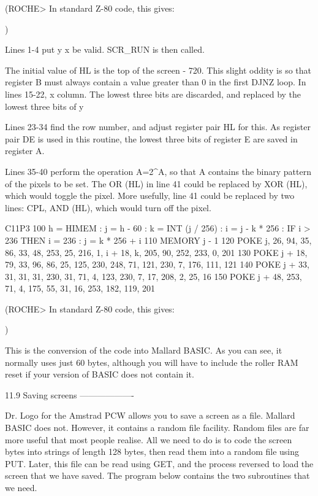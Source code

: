 (ROCHE> In standard Z-80 code, this gives:

$$$$
)

Lines  1-4 put y%
x%
be valid. SCR_RUN is then called.

The initial value of HL is the top of the screen - 720. This slight oddity  is 
so  that  register B must always contain a value greater than 0 in  the  first 
DJNZ loop. In lines 15-22, x%
column. The lowest three bits are discarded, and replaced by the lowest  three 
bits of y%

Lines  23-34  find the row number, and adjust register pair HL  for  this.  As 
register pair DE is used in this routine, the lowest three bits of register  E 
are saved in register A.

Lines 35-40 perform the operation A=2^A, so that A contains the binary pattern 
of the pixels to be set. The OR (HL) in line 41 could be replaced by XOR (HL), 
which would toggle the pixel. More usefully, line 41 could be replaced by  two 
lines: CPL, AND (HL), which would turn off the pixel.

        C11P3
        100 h = HIMEM : j = h - 60 : k = INT (j / 256) : i = j - k * 256 :  IF 
i > 236 THEN i = 236 : j = k * 256 + i
        110 MEMORY j - 1
        120  POKE j, 26, 94, 35, 86, 33, 48, 253, 25, 216, 1, i + 18, k,  205, 
90, 252, 233, 0, 201
        130  POKE j + 18, 79, 33, 96, 86, 25, 125, 230, 248, 71, 121, 230,  7, 
176, 111, 121
        140 POKE j + 33, 31, 31, 31, 230, 31, 71, 4, 123, 230, 7, 17, 208,  2, 
25, 16
        150 POKE j + 48, 253, 71, 4, 175, 55, 31, 16, 253, 182, 119, 201

(ROCHE> In standard Z-80 code, this gives:

$$$$
)

This  is  the conversion of the code into Mallard BASIC. As you  can  see,  it 
normally uses just 60 bytes, although you will have to include the roller  RAM 
reset if your version of BASIC does not contain it.


11.9 Saving screens
-------------------

Dr.  Logo for the Amstrad PCW allows you to save a screen as a  file.  Mallard 
BASIC does not. However, it contains a random file facility. Random files  are 
far  more  useful that most people realise. All we need to do is to  code  the 
screen  bytes into strings of length 128 bytes, then read them into  a  random 
file  using  PUT.  Later, this file can be read using  GET,  and  the  process 
reversed to load the screen that we have saved. The program below contains the 
two subroutines that we need.

